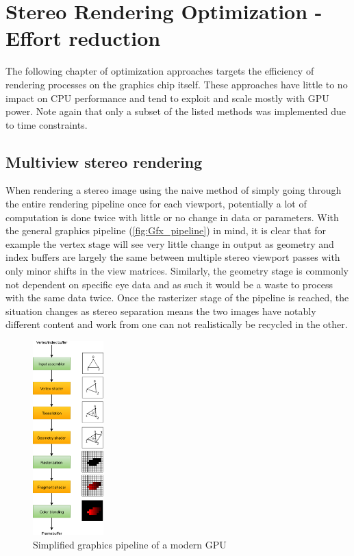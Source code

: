 
\chapter{Stereo Rendering Optimization - Effort reduction}
The following chapter of optimization approaches targets the efficiency of rendering processes on the graphics chip itself. These approaches have little to no impact on CPU performance and tend to exploit and scale mostly with GPU power. 
Note again that only a subset of the listed methods was implemented due to time constraints. 

\section{Multiview stereo rendering}
When rendering a stereo image using the naive method of simply going through the entire rendering pipeline once for each viewport, potentially a lot of computation is done twice with little or no change in data or parameters. 
With the general graphics pipeline (\autoref{fig:Gfx_pipeline}) in mind, it is clear that for example the vertex stage will see very little change in output as geometry and index buffers are largely the same between multiple stereo viewport passes with only minor shifts in the view matrices. Similarly, the geometry stage is commonly not dependent on specific eye data and as such it would be a waste to process with the same data twice. Once the rasterizer stage of the pipeline is reached, the situation changes as stereo separation means the two images have notably different content and work from one can not realistically be recycled in the other. 

\begin{figure}[htb]
  \centering
  \includegraphics[height=7.5cm]{pictures/vulkan_simplified_pipeline}
  \caption{Simplified graphics pipeline of a modern GPU\cite{Overvoorde.}} \label{fig:Gfx_pipeline}
\end{figure}

